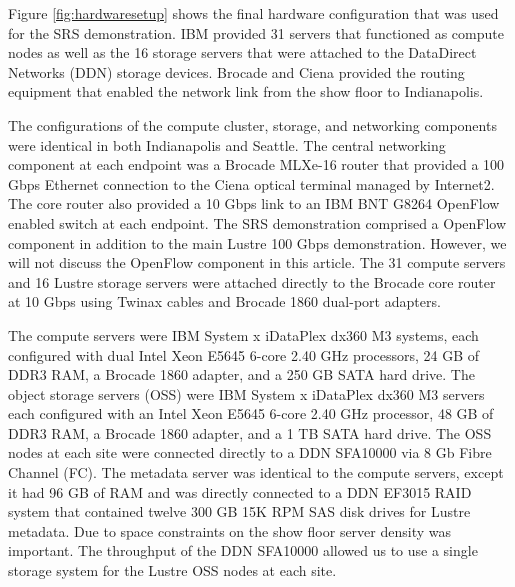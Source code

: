 \documentclass[]{sigplan-proc}
\begin{document}
Figure \ref{fig:hardwaresetup} shows the final hardware configuration that was used for the SRS demonstration. IBM provided 31 servers that functioned as compute nodes as well as the 16 storage servers that
were attached to the DataDirect Networks (DDN) storage devices. Brocade and Ciena provided the routing
equipment that enabled the network link from the show floor to Indianapolis.

The configurations of the compute cluster, storage, and networking components were identical in both
Indianapolis and Seattle. The central networking component at each endpoint was a Brocade MLXe-16 router that
provided a 100 Gbps Ethernet connection to the Ciena optical terminal managed by Internet2. The core router
also provided a 10 Gbps link to an IBM BNT G8264 OpenFlow enabled switch at each endpoint. The SRS
demonstration comprised a OpenFlow component in addition to the main Lustre 100 Gbps demonstration. However,
we will not discuss the OpenFlow component in this article. The 31 compute servers and 16 Lustre storage
servers were attached directly to the Brocade core router at 10 Gbps using Twinax cables and Brocade 1860
dual-port adapters.

The compute servers were IBM System x iDataPlex dx360 M3 systems, each configured with dual Intel Xeon E5645
6-core 2.40 GHz processors, 24 GB of DDR3 RAM, a Brocade 1860 adapter, and a 250 GB SATA hard drive. The
object storage servers (OSS) were IBM System x iDataPlex dx360 M3 servers each configured with an Intel Xeon
E5645 6-core 2.40 GHz processor, 48 GB of DDR3 RAM, a Brocade 1860 adapter, and a 1 TB SATA hard drive. The
OSS nodes at each site were connected directly to a DDN SFA10000 via 8 Gb Fibre Channel (FC). The metadata
server was identical to the compute servers, except it had 96 GB of RAM and was directly connected to a DDN
EF3015 RAID system that contained twelve 300 GB 15K RPM SAS disk drives for Lustre metadata. Due to space
constraints on the show floor server density was important. The throughput of the DDN SFA10000 allowed us to
use a single storage system for the Lustre OSS nodes at each site.
\end{document}
